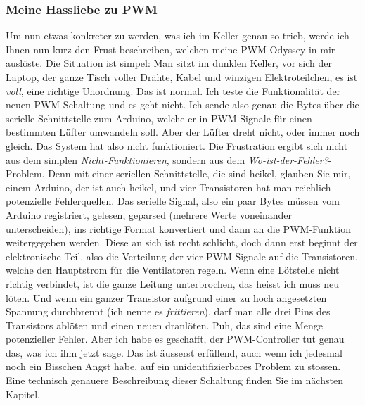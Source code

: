 \documentclass[12pt,titlepage,a4paper]{article}
\begin{document}
\subsubsection{Meine Hassliebe zu PWM}
Um nun etwas konkreter zu werden, was ich im Keller genau so trieb, werde ich Ihnen nun kurz den Frust beschreiben, welchen meine PWM-Odyssey in mir auslöste. Die Situation ist simpel: Man sitzt im dunklen Keller, vor sich der Laptop, der ganze Tisch voller Drähte, Kabel und winzigen Elektroteilchen, es ist \textit{voll}, eine richtige Unordnung. Das ist normal. Ich teste die Funktionalität der neuen PWM-Schaltung und es geht nicht. Ich sende also genau die Bytes über die serielle Schnittstelle zum Arduino, welche er in PWM-Signale für einen bestimmten Lüfter umwandeln soll. Aber der Lüfter dreht nicht, oder immer noch gleich. Das System hat also nicht funktioniert. Die Frustration ergibt sich nicht aus dem simplen \textit{Nicht-Funktionieren}, sondern aus dem \textit{Wo-ist-der-Fehler?}-Problem. Denn mit einer seriellen Schnittstelle, die sind heikel, glauben Sie mir, einem Arduino, der ist auch heikel, und vier Transistoren hat man reichlich potenzielle Fehlerquellen. Das serielle Signal, also ein paar Bytes müssen vom Arduino registriert, gelesen, geparsed (mehrere Werte voneinander unterscheiden), ins richtige Format konvertiert und dann an die PWM-Funktion weitergegeben werden. Diese an sich ist recht schlicht, doch dann erst beginnt der elektronische Teil, also die Verteilung der vier PWM-Signale auf die Transistoren, welche den Hauptstrom für die Ventilatoren regeln. Wenn eine Lötstelle nicht richtig verbindet, ist die ganze Leitung unterbrochen, das heisst ich muss neu löten. Und wenn ein ganzer Transistor aufgrund einer zu hoch angesetzten Spannung durchbrennt (ich nenne es \textit{frittieren}), darf man alle drei Pins des Transistors ablöten und einen neuen dranlöten. Puh, das sind eine Menge potenzieller Fehler. Aber ich habe es geschafft, der PWM-Controller tut genau das, was ich ihm jetzt sage. Das ist äusserst erfüllend, auch wenn ich jedesmal noch ein Bisschen Angst habe, auf ein unidentifizierbares Problem zu stossen. Eine technisch genauere Beschreibung dieser Schaltung finden Sie im nächsten Kapitel.
\end{document}
